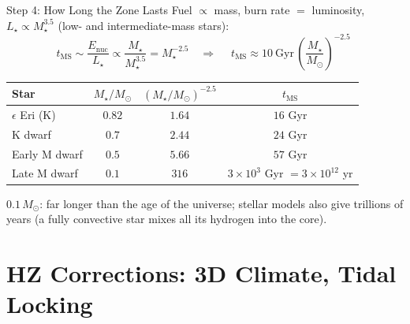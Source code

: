 \documentclass[aspectratio=169, 11pt]{beamer}
\begin{document}
\begin{frame}{Step 4: How Long the Zone Lasts}
  \small
  Fuel $\propto$ mass, burn rate $=$ luminosity, $L_\star \propto M_\star^{3.5}$ (low- and intermediate-mass stars):
  \[
    t_{\mathrm{MS}} \sim \frac{E_{\mathrm{nuc}}}{L_\star} \propto \frac{M_\star}{M_\star^{3.5}} = M_\star^{-2.5}
    \quad\Rightarrow\quad
    \boxed{\;t_{\mathrm{MS}} \approx 10\ \mathrm{Gyr}\,\left(\frac{M_\star}{M_\odot}\right)^{-2.5}\;}
  \]
  {\centering\small
    \begin{tabular}{l c c c}
      \toprule
      Star & $M_\star/M_\odot$ & $(M_\star/M_\odot)^{-2.5}$ & $t_{\mathrm{MS}}$ \\
      \midrule
      $\epsilon$ Eri (K) & $0.82$ & $1.64$ & $16$ Gyr \\
      K dwarf & $0.7$ & $2.44$ & $24$ Gyr \\
      Early M dwarf & $0.5$ & $5.66$ & $57$ Gyr \\
      Late M dwarf & $0.1$ & $316$ & $3 \times 10^{3}$ Gyr $= 3 \times 10^{12}$ yr \\
      \bottomrule
    \end{tabular}
  \par}
  {\footnotesize $0.1\,M_\odot$: far longer than the age of the universe; stellar models also give trillions of years (a fully convective star mixes all its hydrogen into the core).}
\end{frame}

\begin{frame}
\end{frame}


\section{HZ Corrections: 3D Climate, Tidal Locking}
\end{document}
